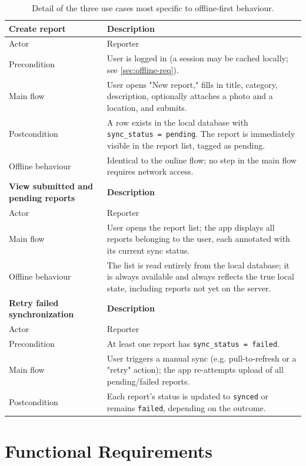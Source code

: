 \begin{table}[htbp]
\centering
\caption{Detail of the three use cases most specific to offline-first
behaviour.}
\label{tab:usecase-detail}
\small
\begin{tabularx}{\textwidth}{@{}l X@{}}
\toprule
\textbf{Create report} & \textbf{Description} \\
\midrule
Actor & Reporter \\
Precondition & User is logged in (a session may be cached locally; see
\cref{sec:offline-req}). \\
Main flow & User opens "New report," fills in title, category,
description, optionally attaches a photo and a location, and submits. \\
Postcondition & A row exists in the local database with
\texttt{sync\_status = pending}. The report is immediately visible in the
report list, tagged as pending. \\
Offline behaviour & Identical to the online flow; no step in the main flow
requires network access. \\
\midrule
\textbf{View submitted and pending reports} & \textbf{Description} \\
\midrule
Actor & Reporter \\
Main flow & User opens the report list; the app displays all reports
belonging to the user, each annotated with its current sync status. \\
Offline behaviour & The list is read entirely from the local database; it
is always available and always reflects the true local state, including
reports not yet on the server. \\
\midrule
\textbf{Retry failed synchronization} & \textbf{Description} \\
\midrule
Actor & Reporter \\
Precondition & At least one report has \texttt{sync\_status = failed}. \\
Main flow & User triggers a manual sync (e.g. pull-to-refresh or a "retry"
action); the app re-attempts upload of all pending/failed reports. \\
Postcondition & Each report's status is updated to \texttt{synced} or
remains \texttt{failed}, depending on the outcome. \\
\bottomrule
\end{tabularx}
\end{table}

\section{Functional Requirements}
\label{sec:functional-req}

